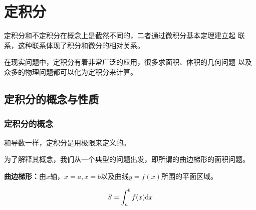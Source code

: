 \setcounter{chapter}{4}

\chapter{定积分}

定积分和不定积分在概念上是截然不同的，二者通过微积分基本定理建立起
联系，这种联系体现了积分和微分的相对关系。

在现实问题中，定积分有着非常广泛的应用，很多求面积、体积的几何问题
以及众多的物理问题都可以化为定积分来计算。

\section{定积分的概念与性质}

\subsection{定积分的概念}

和导数一样，定积分是用极限来定义的。

为了解释其概念，我们从一个典型的问题出发，即所谓的曲边梯形的面积问题。

{\bf 曲边梯形：}由$x$轴，$x=a,x=b$以及曲线$y=f(x)$所围的平面区域。

\begin{center}
	
	$$S=\displaystyle\int_a^bf(x)\mathrm{d} x$$
\end{center}

